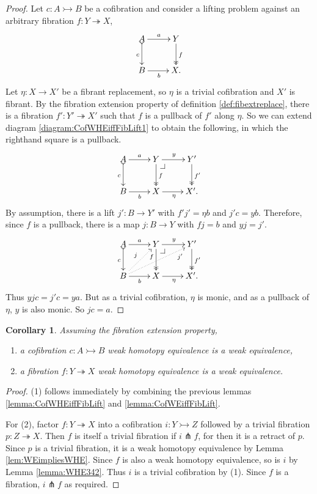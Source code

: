 \documentclass[11pt]{amsart}
\makeatletter
\newcommand{\mono}{\ensuremath{\rightarrowtail}}
\newcommand{\ra}{\ensuremath{\rightarrow}}
\newcommand{\onto}{\ensuremath{\twoheadrightarrow}}
\newtheorem{corollary}[theorem]{Corollary}
\theoremstyle{remark}
\theoremstyle{definition}
\newcommand{\pbcorner}[1][dr]{\save*!/#1-1.2pc/#1:(-1,1)@^{|-}\restore}
\makeatother
\begin{document}
\begin{proof}
Let $c : A\mono B$ be a cofibration and consider a lifting problem against an arbitrary fibration $f: Y\onto X$,
\begin{equation}\label{diagram:CofWHEiffFibLift1}
\xymatrix{
A \ar@{>->}[d]_{c} \ar[r]^-{a}  & Y \ar@{>>}[d]^{f} \\
B \ar[r]_{b} &  X.
}
\end{equation}
Let $\eta: X\ra X'$ be a fibrant replacement, so $\eta$ is a trivial cofibration and $X'$ is fibrant. 
By the fibration extension property of definition \ref{def:fibextreplace}, there is a fibration $f' : Y' \onto X'$ such that $f$ is a pullback of $f'$ along $\eta$. So we can extend diagram \eqref{diagram:CofWHEiffFibLift1} to obtain the following, in which the righthand square is a pullback.
\begin{equation}\label{diagram:CofWHEiffFibLift2}
\xymatrix{
A \ar@{>->}[d]_{c} \ar[r]^-{a}  & Y \ar@{>>}[d]^{f} {\pbcorner} \ar[r]^{y} & Y' \ar@{>>}[d]^{f'} \\
B \ar[r]_{b} &  X  \ar[r]_\eta &  X'.
}
\end{equation}
By assumption, there is a lift $j' : B\ra Y'$ with $f' j' = \eta b$ and $j'c = yb$.  Therefore, since $f$ is a pullback, there is a map $j : B\ra Y$ with $fj = b$ and $y j = j'$.  
\begin{equation}\label{diagram:CofWHEiffFibLift2}
\xymatrix{
A \ar@{>->}[d]_{c} \ar[r]^-{a}  & Y \ar@{>>}[d]_<<<<{f} {\pbcorner} \ar[r]^{y} & Y' \ar@{>>}[d]^{f'} \\
B \ar[r]_{b} \ar@{..>}[ru]^{j} \ar@{..>}[rru]_>>>>{j'} &  X  \ar[r]_\eta &  X'.
}
\end{equation}
Thus $yjc = j'c = ya$.  But as a trivial cofibration, $\eta$ is monic, and as a pullback of $\eta$, $y$ is also monic. So $jc=a$.
\end{proof}

\begin{corollary}\label{cor:CofWHEtoWE}
Assuming the fibration extension property,  
\begin{enumerate}
\item a cofibration $c : A \mono B$ weak homotopy equivalence is a weak equivalence,
\item a fibration $ f : Y \onto X$ weak homotopy equivalence is a weak equivalence.
\end{enumerate}
\end{corollary}

\begin{proof}
(1) follows immediately by combining the previous lemmas \ref{lemma:CofWHEiffFibLift} and \ref{lemma:CofWEiffFibLift}.

For (2), factor $ f : Y \onto X$ into a cofibration $i : Y\mono Z$ followed by a trivial fibration $p: Z\onto X$.  Then $f$ is itself a trivial fibration if $i\pitchfork f$, for then it is a retract of $p$.  Since $p$ is a trivial fibration, it is a weak homotopy equivalence by Lemma \ref{lem:WEimpliesWHE}.  Since $f$ is also a weak homotopy equivalence, so is $i$ by Lemma \ref{lemma:WHE342}.  Thus $i$ is a trivial cofibration by (1). Since $f$ is a fibration, $i\pitchfork f$ as required.
\end{proof}
\end{document}
